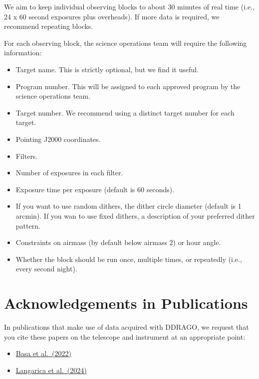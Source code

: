 We aim to keep individual observing blocks to about 30 minutes of real time (i.e., 24 x 60 second exposures plus overheads). If more data is required, we recommend repeating blocks.

For each observing block, the science operations team will require the following information:

\begin{itemize}
\item Target name. This is strictly optional, but we find it useful.
\item Program number. This will be assigned to each approved program by the science operations team.
\item Target number. We recommend using a distinct target number for each target.
\item Pointing J2000 coordinates.
\item Filters.
\item Number of exposures in each filter.
\item Exposure time per exposure (default is 60 seconds).
\item If you want to use random dithers, the dither circle diameter (default is 1 arcmin). If you wan to use fixed dithers, a description of your preferred dither pattern.
\item Constraints on airmass (by default below airmass 2) or hour angle.
\item Whether the block should be run once, multiple times, or repeatedly (i.e., every second night).
\end{itemize}

\section{Acknowledgements in Publications}

In publications that make use of data acquired with DDRAGO, we request that you cite these papers on the telescope and instrument at an appropriate point:

\begin{itemize}
\item \href{https://ui.adsabs.harvard.edu/abs/2022SPIE12182E..1SB/abstract}{Basa et al.\ (2022)}
\item \href{https://ui.adsabs.harvard.edu/abs/2024SPIE13096E..3DL/abstract}{Langarica et al.\ (2024)}

\end{itemize}

